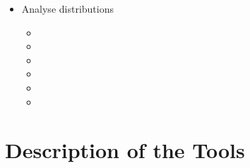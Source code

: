 \begin{itemize}
\begin{itemize}
      \item {}
      \item {}
    \end{itemize} 
  \item Analyse distributions
    \begin{itemize}
      \item {}
      \item {}
      \item {}
      \item {}
      \item {}
      \item {}
    \end{itemize} 
\end{itemize}


\section{Description of the Tools}


